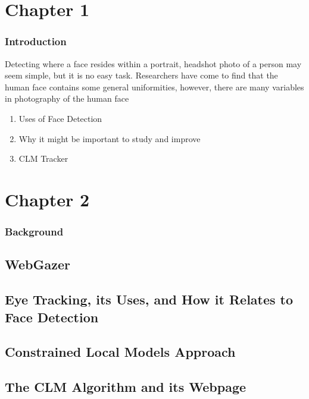 \documentclass{article}
\begin{document}
\section*{Chapter 1}

\subsubsection*{Introduction}

Detecting where a face resides within a portrait, headshot photo of a person may seem simple, but it is no easy task. Researchers have come to find that the human face contains some general uniformities, however, there are many variables in photography of the human face

\begin{enumerate}
	\item Uses of Face Detection
	\item Why it might be important to study and improve
	\item CLM Tracker
\end{enumerate}

\newpage

\setcounter{section}{2}
\section*{Chapter 2}

\subsubsection*{Background}

\subsection{WebGazer}
\subsection{Eye Tracking, its Uses, and How it Relates to Face Detection}
\subsection{Constrained Local Models Approach}
\subsection{The CLM Algorithm and its Webpage}

\newpage

\setcounter{section}{3}
\setcounter{subsection}{0}
\end{document}
